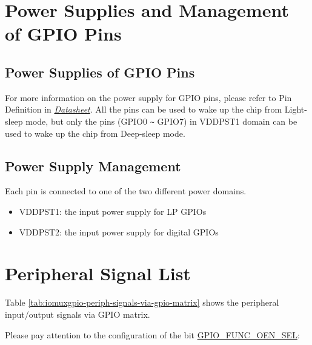 \documentclass[main\_\_EN.tex]{subfiles}
\begin{document}
\section{Power Supplies and Management of GPIO Pins}\label{I/O Pad Power Supplies}

\subsection{Power Supplies of GPIO Pins}
For more information on the power supply for GPIO pins, please refer to Pin Definition in {\textit{\href{https://www.espressif.com/sites/default/files/documentation/esp32-c6_datasheet_en.pdf}{\chipname{} Datasheet}}}. All the pins can be used to wake up the chip from Light-sleep mode, but only the pins (GPIO0 \verb+~+ GPIO7) in VDDPST1 domain can be used to wake up the chip from Deep-sleep mode.

\subsection{Power Supply Management}

Each \chipname{} pin is connected to one of the two different power domains.

\begin{itemize}
    \item VDDPST1: the input power supply for LP GPIOs
    \item VDDPST2: the input power supply for digital GPIOs
\end{itemize}

\section{Peripheral Signal List}
\label{  sec:peripheral_signals}

Table \ref{tab:iomuxgpio-periph-signals-via-gpio-matrix} shows the peripheral input/output signals via GPIO matrix.

Please pay attention to the configuration of the bit \hyperref[fielddesc:GPIOFUNCNOENSEL]{GPIO\_FUNC\_OEN\_SEL}:
\end{document}
